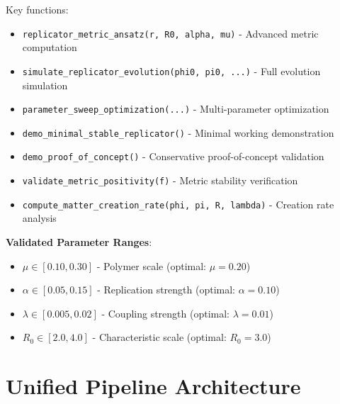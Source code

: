 \documentclass[11pt]{article}
\begin{document}
Key functions:
\begin{itemize}
\item \texttt{replicator\_metric\_ansatz(r, R0, alpha, mu)} - Advanced metric computation
\item \texttt{simulate\_replicator\_evolution(phi0, pi0, ...)} - Full evolution simulation
\item \texttt{parameter\_sweep\_optimization(...)} - Multi-parameter optimization
\item \texttt{demo\_minimal\_stable\_replicator()} - Minimal working demonstration  
\item \texttt{demo\_proof\_of\_concept()} - Conservative proof-of-concept validation
\item \texttt{validate\_metric\_positivity(f)} - Metric stability verification
\item \texttt{compute\_matter\_creation\_rate(phi, pi, R, lambda)} - Creation rate analysis
\end{itemize}

\textbf{Validated Parameter Ranges}:
\begin{itemize}
\item $\mu \in [0.10, 0.30]$ - Polymer scale (optimal: $\mu = 0.20$)
\item $\alpha \in [0.05, 0.15]$ - Replication strength (optimal: $\alpha = 0.10$)  
\item $\lambda \in [0.005, 0.02]$ - Coupling strength (optimal: $\lambda = 0.01$)
\item $R_0 \in [2.0, 4.0]$ - Characteristic scale (optimal: $R_0 = 3.0$)
\end{itemize}

\section{Unified Pipeline Architecture}
\end{document}
